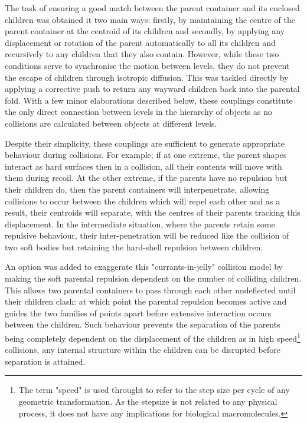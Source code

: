 The task of ensuring a good match between the parent container and its enclosed
children was obtained it two main ways: firstly, by maintaining the centre of the
parent container at the centroid of its children and secondly, by applying any
displacement or rotation of the parent automatically to all its children and recursively
to any children that they also contain.   However, while these two conditions serve
to synchronise the motion between levels, they do not prevent the escape of children
through isotropic diffusion.   This was tackled directly by applying a corrective push
to return any wayward children back into the parental fold.   With a few minor elaborations
described below, these couplings constitute the only direct connection between levels in the
hierarchy of objects as no collisions are calculated between objects at different levels.

Despite their simplicity, these couplings are sufficient to generate appropriate
behaviour during collisions.   For example; if at one extreme, the parent shapes interact
as hard surfaces then in a collision, all their contents will move with them during
recoil.   At the other extreme, if the parents have no repulsion but their children do,
then the parent containers will interpenetrate, allowing collisions to occur between
the children which will repel each other and as a result, their centroids will 
separate, with the centres of their parents tracking this displacement.   In the intermediate
situation, where the parents retain some repulsive behaviour, their inter-penetration
will be reduced like the collision of two soft bodies but retaining the hard-shell
repulsion between children.   

An option was added to exaggerate this "currants-in-jelly" collision model by making
the soft parental repulsion dependent on the number of colliding children.   This
allows two parental containers to pass through each other undeflected until their
children clash: at which point the parental repulsion becomes active and guides the
two families of points apart before extensive interaction occurs between the 
children.   Such behaviour prevents the separation of the parents being completely
dependent on the displacement of the children as in high speed\footnote{
The term "speed" is used throught to refer to the step size per cycle of any
geometric transformation.   As the stepsize is not related to any physical
process, it does not have any implications for biological macromolecules.
}
collisions, any
internal structure within the children can be disrupted before separation is attained.

